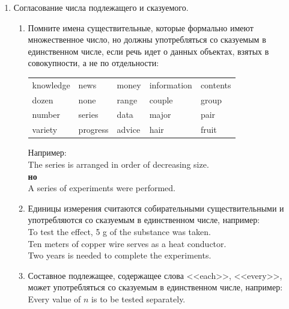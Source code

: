 \documentclass[a5paper, 10pt, twoside, numbers=enddot]{scrartcl}
\begin{document}
\begin{enumerate}
  \item Согласование числа подлежащего и сказуемого.
    \begin{enumerate}
      \item Помните имена существительные, которые формально имеют множественное число, но должны
        употребляться со сказуемым в единственном числе, если речь идет о данных объектах, взятых в
        совокупности, а не по отдельности:
        \begin{center}
          \sffamily
          \begin{tabular}{lllll}
            knowledge & news     & money  & information & contents\\
            dozen     & none     & range  & couple      & group\\
            number    & series   & data   & major       & pair\\
            variety   & progress & advice & hair        & fruit
          \end{tabular}
        \end{center}
        Например:\\ [4pt]
        \textsf{
          The series is arranged in order of decreasing size.\\ [4pt]
          \textbf{но}\\ [4pt]
          A series of experiments were performed.
        }

      \item Единицы измерения считаются собирательными существительными и употребляются со сказуемым
        в единственном числе, например:\\ [4pt]
        \textsf{
          To test the effect, 5 g of the substance was taken.\\ [4pt]
          Ten meters of copper wire serves as a heat conductor.\\ [4pt]
          Two years is needed to complete the experiments.
        }

      \item Составное подлежащее, содержащее слова <<each>>, <<every>>, может употребляться со
        сказуемым в единственном числе, например:\\ [4pt]
        \textsf{Every value of $n$ is to be tested separately.}
    \end{enumerate}


\end{enumerate}
\end{document}
